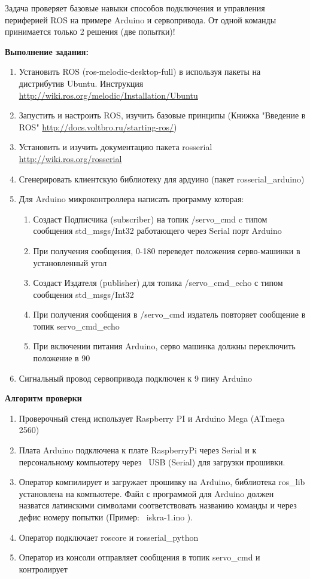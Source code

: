 
Задача проверяет базовые навыки способов подключения и управления периферией ROS на примере Arduino и сервопривода. От одной команды принимается только 2 решения (две попытки)!

\textbf{Выполнение задания:}

\begin{enumerate}
    \item Установить ROS (ros-melodic-desktop-full) в используя пакеты на дистрибутив Ubuntu. Инструкция \url{http://wiki.ros.org/melodic/Installation/Ubuntu}
    \item Запустить и настроить ROS, изучить базовые принципы (Книжка "Введение в ROS" \url{http://docs.voltbro.ru/starting-ros/})
    \item Установить и изучить документацию пакета rosserial \url{http://wiki.ros.org/rosserial}
    \item Сгенерировать клиентскую библиотеку для ардуино (пакет rosserial\_arduino)
    \item Для Arduino микроконтроллера написать программу которая:
    \begin{enumerate}
        \item Создаст Подписчика (subscriber) на топик /servo\_cmd c типом сообщения std\_msgs/Int32 работающего через Serial порт Arduino
        \item При получения сообщения, 0-180 переведет положения серво-машинки в установленный угол
        \item Создаст Издателя (publisher) для топика /servo\_cmd\_echo с типом сообщения std\_msgs/Int32
        \item При получения сообщения в /servo\_cmd издатель повторяет сообщение в топик servo\_cmd\_echo 
        \item При включении питания Arduino, серво машинка должны переключить положение в 90
    \end{enumerate}
    \item Сигнальный провод сервопривода подключен к 9 пину Arduino
\end{enumerate}

\textbf{Алгоритм проверки}

\begin{enumerate}
    \item Проверочный стенд использует Raspberry PI и Arduino Mega (ATmega 2560)
    \item Плата Arduino подключена к плате RaspberryPi через Serial и к персональному компьютеру через  USB (Serial) для загрузки прошивки.
    \item Оператор компилирует и загружает прошивку на Arduino, библиотека ros\_lib установлена на компьютере. Файл с программой для Arduino должен назватся латинскими символами соответствовать названию команды и через дефис номеру попытки (Пример:  iskra-1.ino ).
    \item Оператор подключает roscore и rosserial\_python
    \item Оператор из консоли отправляет сообщения в топик servo\_cmd и контролирует
\end{enumerate}

